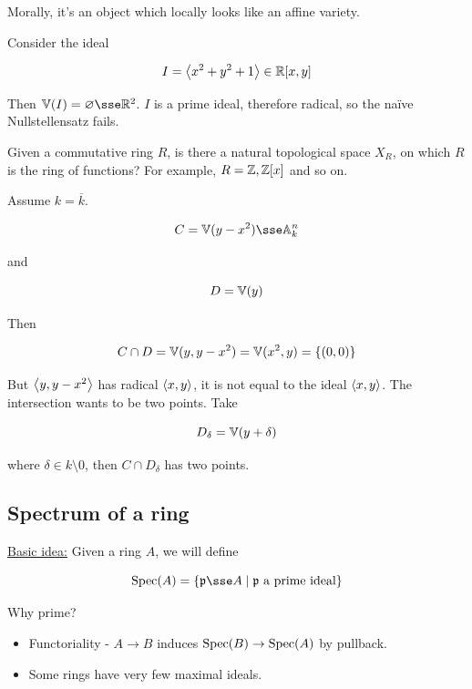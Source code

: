\documentclass{article}
\begin{document}
Morally, it's an object which locally looks like an affine variety.

\begin{example}
     Consider the ideal

    \[I = \left\langle x^2 + y^2 + 1 \right\rangle \in \mathbb{R}[x, y]\]

    Then \(\van(I) = \emptyset \sse \R^2\). \(I\) is a prime ideal, therefore radical, so the na\"ive Nullstellensatz fails.
\end{example}

\begin{question}
    Given a commutative ring \(R\), is there a natural topological space \(X_R\), on which \(R\) is the ring of functions? For example, \(R = \mathbb{Z}, \mathbb{Z}[x]\) and so on.
\end{question}

\begin{example}
     Assume \(k = \overline k\).

    \[C = \van(y - x^2) \sse \aff k n\]

    and

    \[D = \mathbb{V}(y)\]

    Then

    \[C \cap D = \mathbb{V}(y, y-x^2) = \mathbb{V}(x^2, y) = \left\{(0, 0)\right\}\]

    But \(\left\langle y, y-x^2 \right\rangle\) has radical \(\left\langle x, y \right\rangle\), it is not equal to the ideal \(\left\langle x, y \right\rangle\). The intersection wants to be two points. Take

    \[D_{\delta} = \mathbb{V}(y + \delta)\]

    where \(\delta \in k \setminus 0\), then \(C \cap D_\delta\) has two points.
\end{example}

\subsection{Spectrum of a ring}

\underline{Basic idea:} Given a ring \(A\), we will define

\[\Spec(A) = \left\{\mfp \sse A \mid \mfp \text{ a prime ideal}\right\}\]

Why prime?

\begin{itemize}
    \item Functoriality - \(A \to B\) induces \(\operatorname{Spec}(B) \to \operatorname{Spec}(A)\) by pullback.
    \item Some rings have very few maximal ideals.
\end{itemize}
\end{document}
